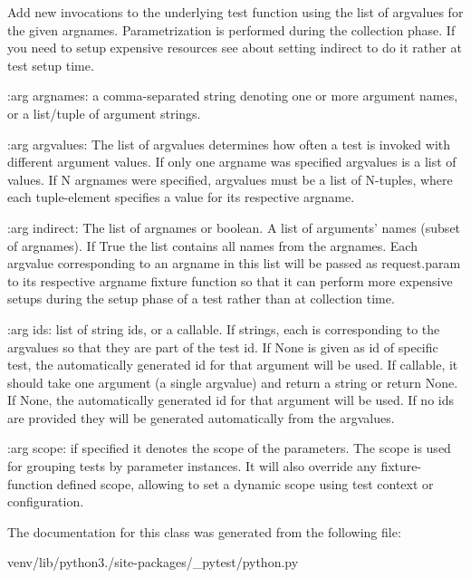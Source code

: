 \begin{DoxyVerb}Add new invocations to the underlying test function using the list
of argvalues for the given argnames.  Parametrization is performed
during the collection phase.  If you need to setup expensive resources
see about setting indirect to do it rather at test setup time.

:arg argnames: a comma-separated string denoting one or more argument
       names, or a list/tuple of argument strings.

:arg argvalues: The list of argvalues determines how often a
    test is invoked with different argument values.  If only one
    argname was specified argvalues is a list of values.  If N
    argnames were specified, argvalues must be a list of N-tuples,
    where each tuple-element specifies a value for its respective
    argname.

:arg indirect: The list of argnames or boolean. A list of arguments'
    names (subset of argnames). If True the list contains all names from
    the argnames. Each argvalue corresponding to an argname in this list will
    be passed as request.param to its respective argname fixture
    function so that it can perform more expensive setups during the
    setup phase of a test rather than at collection time.

:arg ids: list of string ids, or a callable.
    If strings, each is corresponding to the argvalues so that they are
    part of the test id. If None is given as id of specific test, the
    automatically generated id for that argument will be used.
    If callable, it should take one argument (a single argvalue) and return
    a string or return None. If None, the automatically generated id for that
    argument will be used.
    If no ids are provided they will be generated automatically from
    the argvalues.

:arg scope: if specified it denotes the scope of the parameters.
    The scope is used for grouping tests by parameter instances.
    It will also override any fixture-function defined scope, allowing
    to set a dynamic scope using test context or configuration.
\end{DoxyVerb}
 

The documentation for this class was generated from the following file\+:\begin{DoxyCompactItemize}
\item 
venv/lib/python3./site-\/packages/\+\_\+pytest/python.\+py\end{DoxyCompactItemize}
